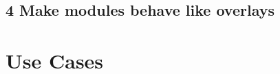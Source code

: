 \documentclass[12pt,notitlepage]{article}
\begin{document}
\subsection*{4 Make modules behave like overlays}

\section{Use Cases}

\subsubsection{}

\newpage
\listoffigures
\lstlistoflistings
\end{document}
